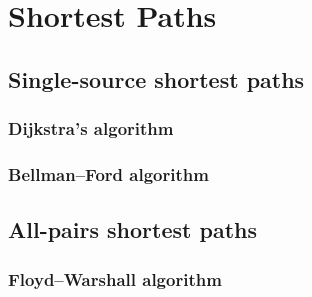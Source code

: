 \chapter{Shortest Paths}
\label{chap:shortestpaths}

\section{Single-source shortest paths}
\subsection{Dijkstra's algorithm}
\subsection{Bellman--Ford algorithm}

\section{All-pairs shortest paths}
\subsection{Floyd--Warshall algorithm}